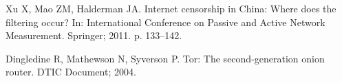 \documentclass[10pt,letterpaper]{article}
\begin{document}
\begin{thebibliography}{10}
Xu X, Mao ZM, Halderman JA.
\newblock Internet censorship in {China}: {Where} does the filtering occur?
\newblock In: International {Conference} on {Passive} and {Active} {Network}
  {Measurement}. Springer; 2011. p. 133--142.

Dingledine R, Mathewson N, Syverson P.
\newblock Tor: {The} second-generation onion router.
\newblock DTIC Document; 2004.

\end{thebibliography}
\end{document}

